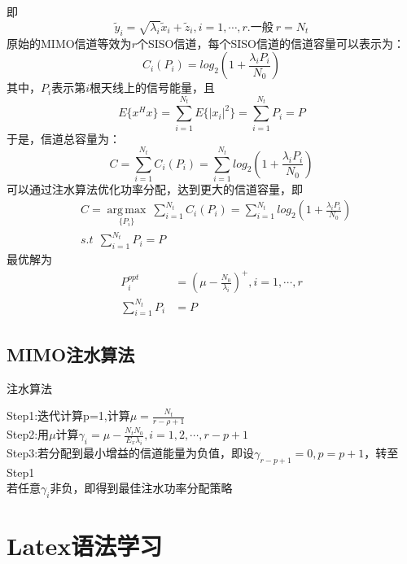 \documentclass[12pt,a4paper]{ctexart}  %
\begin{document}
即
\begin{equation}
    \tilde{y}_i=\sqrt{\lambda_i}\tilde{x}_i+\tilde{z}_i, i=1,\cdots,r.一般\ r=N_t
\end{equation}
原始的MIMO信道等效为$r$个SISO信道，每个SISO信道的信道容量可以表示为：
\begin{equation}
    C_i(P_i)=log_2(1+\frac{\lambda_iP_i}{N_0})
\end{equation}
其中，$P_i$表示第$i$根天线上的信号能量，且
\begin{equation}
    E\{x^Hx\}=\sum_{i=1}^{N_t}E\{|x_i|^2\}=\sum_{i=1}^{N_t}P_i=P
\end{equation}
于是，信道总容量为：
\begin{equation}
    C=\sum_{i=1}^{N_t}C_i(P_i)=\sum_{i=1}^{N_t}log_2(1+\frac{\lambda_iP_i}{N_0})
\end{equation}
可以通过注水算法优化功率分配，达到更大的信道容量，即
\begin{equation}
    \begin{aligned}
        & C={\underset{\{P_i\}} {\operatorname {arg\,max}}}\ \sum_{i=1}^{N_t}C_i(P_i)=\sum_{i=1}^{N_t}log_2(1+\frac{\lambda_iP_i}{N_0}) \\
        & s.t\ \  \sum_{i=1}^{N_t}P_i=P 
    \end{aligned}
\end{equation}
最优解为   
\begin{equation}
    \begin{aligned}
        P_i^{opt}&=(\mu -\frac{N_0}{\lambda_i})^+, i=1,\cdots,r \\
        \sum_{i=1}^{N_t}P_i&=P
    \end{aligned}
\end{equation}

\subsection{MIMO注水算法}
\begin{algorithm}
    \caption{注水算法}
    Step1:迭代计算p=1,计算$\mu=\frac{N_t}{r-\rho+1}$ \\
    Step2:用$\mu$计算$\gamma_i=\mu-\frac{N_tN_0}{E_x\lambda_i},i=1,2,\cdots,r-p+1$ \\
    Step3:若分配到最小增益的信道能量为负值，即设$\gamma_{r-p+1}=0,p=p+1$，转至Step1 \\
    若任意$\gamma_i$非负，即得到最佳注水功率分配策略
\end{algorithm}

\section{Latex语法学习}
\end{document}
